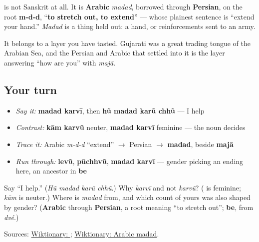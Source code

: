 \begin{cousinweb}
\textbf{} is not Sanskrit at all. It is \textbf{Arabic} \emph{madad}, borrowed through \textbf{Persian}, on the root \textbf{m-d-d}, \textquotedblleft{}\textbf{to stretch out, to extend}\textquotedblright{} — whose plainest sentence is \textquotedblleft{}extend your hand.\textquotedblright{} \emph{Madad} is a thing held out: a hand, or reinforcements sent to an army.

It belongs to a layer you have tasted. Gujarati was a great trading tongue of the Arabian Sea, and the Persian and Arabic that settled into it is the layer answering \textquotedblleft{}how are you\textquotedblright{} with \textbf{} \emph{majā}.
\end{cousinweb}

\subsection*{Your turn}
\begin{itemize}
\raggedright
  \item \emph{Say it:} \textbf{madad karvī}, then \textbf{hũ madad karũ chhũ} — I help
  \item \emph{Contrast:} \textbf{kām karvũ} neuter, \textbf{madad karvī} feminine — the noun decides
  \item \emph{Trace it:} Arabic \emph{m-d-d} \textquotedblleft{}extend\textquotedblright{} $\to$ Persian $\to$ \textbf{madad}, beside \textbf{majā}
  \item \emph{Run through:} \textbf{levũ}, \textbf{pūchhvũ}, \textbf{madad karvī} — gender picking an ending here, an ancestor in \textbf{be}
\end{itemize}

\begin{tcolorbox}[breakable,colback=teal!4,colframe=teal!35!black,title={Before you move on}]
Say \textquotedblleft{}I help.\textquotedblright{} (\emph{Hũ madad karũ chhũ}.) Why \emph{karvī} and not \emph{karvũ}? (\textbf{} is feminine; \emph{kām} is neuter.) Where is \emph{madad} from, and which count of yours was also shaped by gender? (\textbf{Arabic} through \textbf{Persian}, a root meaning \textquotedblleft{}to stretch out\textquotedblright{}; \textbf{be}, from \emph{dvé}.)

Sources: \href{https://en.wiktionary.org/wiki/\%E0\%AA\%AE\%E0\%AA\%A6\%E0\%AA\%A6}{Wiktionary: }; \href{https://en.wiktionary.org/wiki/\%D9\%85\%D8\%AF\%D8\%AF}{Wiktionary: Arabic madad}.
\end{tcolorbox}
